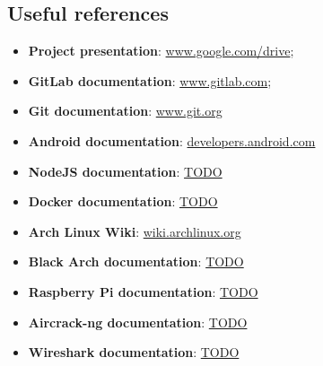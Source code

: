 \documentclass[../PiTest.tex]{subfiles}
\begin{document}
	\subsection{Useful references}
		\begin{itemize}
			\item\textbf{Project presentation}: \url{www.google.com/drive}; %
			\item\textbf{GitLab documentation}: \url{www.gitlab.com}; %
			\item\textbf{Git documentation}: \url{www.git.org} %
			\item\textbf{Android documentation}: \url{developers.android.com} %
			\item\textbf{NodeJS documentation}: \url{TODO} %
			\item\textbf{Docker documentation}: \url{TODO}%
			\item\textbf{Arch Linux Wiki}: \url{wiki.archlinux.org} %
			\item\textbf{Black Arch documentation}: \url{TODO} %
			\item\textbf{Raspberry Pi documentation}: \url{TODO} %
			\item\textbf{Aircrack-ng documentation}: \url{TODO} %
			\item\textbf{Wireshark documentation}: \url{TODO} %
		\end{itemize}
			
\end{document}
